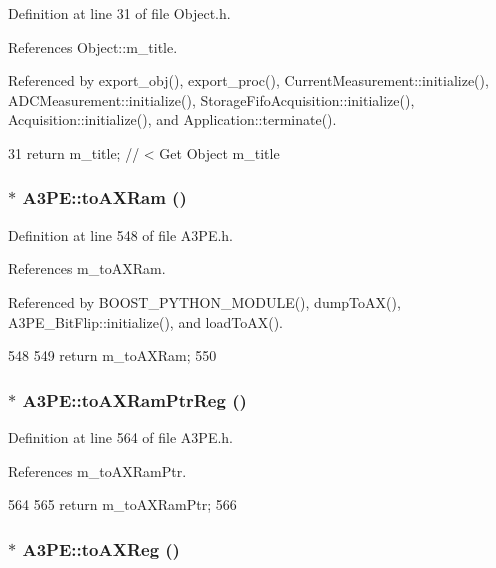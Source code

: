 Definition at line 31 of file Object.h.

References Object::m\_\-title.

Referenced by export\_\-obj(), export\_\-proc(), CurrentMeasurement::initialize(), ADCMeasurement::initialize(), StorageFifoAcquisition::initialize(), Acquisition::initialize(), and Application::terminate().


\begin{DoxyCode}
31 { return m_title;      } // < Get Object m_title
\end{DoxyCode}
\hypertarget{classA3PE_a16b16ac12705b9dd93d70fa172deb584}{
\subsubsection[{toAXRam}]{$\ast$ A3PE::toAXRam ()}}
\label{classA3PE_a16b16ac12705b9dd93d70fa172deb584}


Definition at line 548 of file A3PE.h.

References m\_\-toAXRam.

Referenced by BOOST\_\-PYTHON\_\-MODULE(), dumpToAX(), A3PE\_\-BitFlip::initialize(), and loadToAX().


\begin{DoxyCode}
548                 {
549     return m_toAXRam;
550   }
\end{DoxyCode}
\hypertarget{classA3PE_af6e9e980e871fcf0e1b35e1b4ae95ebe}{
\subsubsection[{toAXRamPtrReg}]{$\ast$ A3PE::toAXRamPtrReg ()}}
\label{classA3PE_af6e9e980e871fcf0e1b35e1b4ae95ebe}


Definition at line 564 of file A3PE.h.

References m\_\-toAXRamPtr.


\begin{DoxyCode}
564                            {
565     return m_toAXRamPtr;
566   }
\end{DoxyCode}
\hypertarget{classA3PE_a43b0006fafa3aeae353abb2ac30e872c}{
\subsubsection[{toAXReg}]{$\ast$ A3PE::toAXReg ()}}
\label{classA3PE_a43b0006fafa3aeae353abb2ac30e872c}



